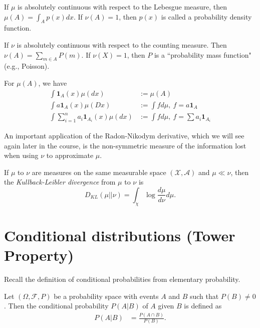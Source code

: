 \documentclass[twoside]{article}
\begin{document}
\begin{example}
  If $\mu$ is absolutely continuous with respect to the Lebesgue measure,
  then $\mu(A) = \int_A p(x) dx$.  If $\nu(A) =
  1$, then $p(x)$ is called a probability density function.
\end{example}

\begin{example}
  If $\nu$ is absolutely continuous with respect to the counting measure. Then $\nu(A)
  = \sum_{m \in A} P(m)$.  If $\nu(X) = 1$, then $P$ is a ``probability mass
  function" (e.g., Poisson).
\end{example}

For $\mu(A)$, we have
\begin{align*}
   \int \mathbf{1}_A(x) \mu(dx) &:= \mu(A) \\
   \int a \mathbf{1}_A(x) \mu(Dx) &:= \int f d\mu,\ f = a \mathbf{1}_A \\
   \int \sum_{i=1}^n a_i \mathbf{1}_{A_i}(x) \mu(dx) &:= \int f d\mu,\ f = \sum
   a_i \mathbf{1}_{A_i}
\end{align*}

An important application of the Radon-Nikodym derivative, which we will see
again later in the course, is the non-symmetric measure of the information
lost when using $\nu$ to approximate $\mu$.

\begin{definition}
  If  $\mu$ to $\nu$ are measures on the same measurable space
  $(\mathcal X, \mathcal A)$ and
  $\mu \ll \nu$, then the \emph{Kullback-Leibler divergence} from
  $\mu$ to $\nu$ is
  \[ D_{KL}(\mu || \nu) = \int_\chi \log \frac{d\mu}{d\nu} d\mu. \]
\end{definition}

\section{Conditional distributions (Tower Property)}

Recall the definition of conditional probabilities from elementary probability.

\begin{definition}
  Let $(\Omega, \mathcal F, P)$ be a probability space with events $A$ and $B$
  such that $P(B) \neq 0$.  Then the conditional probability $P(A|B)$ of $A$
  given $B$ is defined as 
  \begin{align*}
    P(A | B) &= \frac{P(A \cap B)}{P(B)}. 
  \end{align*}
\end{definition}
\end{document}
